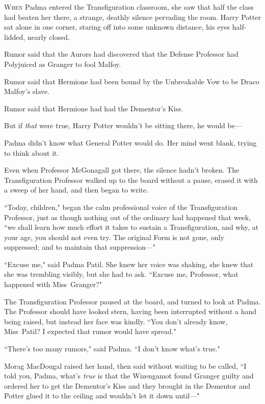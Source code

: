 
\lettrine{W}{hen} Padma entered the Transfiguration classroom, she saw that half the class had beaten her there, a strange, deathly silence pervading the room. Harry Potter sat alone in one corner, staring off into some unknown distance, his eyes half-lidded, nearly closed.

Rumor said that the Aurors had discovered that the Defense Professor had Polyjuiced as Granger to fool Malfoy.

Rumor said that Hermione had been bound by the Unbreakable Vow to be Draco Malfoy's slave.

Rumor said that Hermione had had the Dementor's Kiss.

But if \emph{that} were true, Harry Potter wouldn't be sitting there, he would be—

Padma didn't know what General Potter would do. Her mind went blank, trying to think about it.

Even when Professor McGonagall got there, the silence hadn't broken. The Transfiguration Professor walked up to the board without a pause, erased it with a sweep of her hand, and then began to write.

``Today, children," began the calm professional voice of the Transfiguration Professor, just as though nothing out of the ordinary had happened that week, ``we shall learn how much effort it takes to sustain a Transfiguration, and why, at your age, you should not even try. The original Form is not gone, only suppressed; and to maintain that suppression—"

``Excuse me," said Padma Patil. She knew her voice was shaking, she knew that she was trembling visibly, but she had to ask. ``Excuse me, Professor, what happened with Miss~Granger?"

The Transfiguration Professor paused at the board, and turned to look at Padma. The Professor should have looked stern, having been interrupted without a hand being raised, but instead her face was kindly. ``You don't already know, Miss~Patil? I expected that rumor would have spread."

``There's too many rumors," said Padma. ``I don't know what's true."

Morag MacDougal raised her hand, then said without waiting to be called, ``I told you, Padma, what's \emph{true} is that the Wizengamot found Granger guilty and ordered her to get the Dementor's Kiss and they brought in the Dementor and Potter glued it to the ceiling and wouldn't let it down until—"

